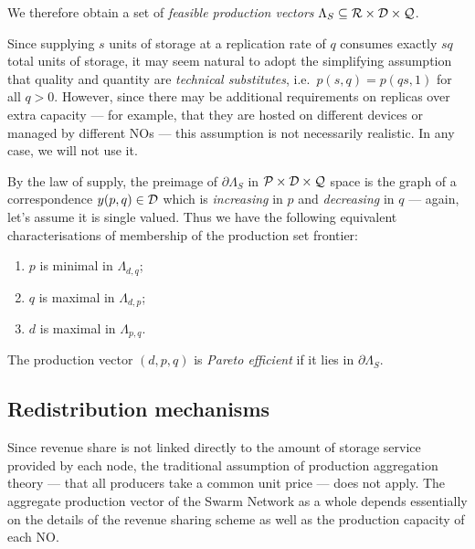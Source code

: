We therefore obtain a set of \emph{feasible production vectors} $\Lambda_S\subseteq\mathcal{R}\times\mathcal{D}\times\mathcal{Q}$.

\begin{remark}

  Since supplying $s$ units of storage at a replication rate of $q$ consumes exactly $sq$ total units of storage, it may seem natural to adopt the simplifying assumption that quality and quantity are \emph{technical substitutes}, i.e.~$p(s,q)=p(qs,1)$ for all $q>0$.
  However, since there may be additional requirements on replicas over extra capacity --- for example, that they are hosted on different devices or managed by different NOs --- this assumption is not necessarily realistic.
  In any case, we will not use it.

\end{remark}

By the law of supply, the preimage of $\partial\Lambda_S$ in $\mathcal{P}\times\mathcal{D}\times\mathcal{Q}$ space is the graph of a correspondence $y(p,q)\in\mathcal{D}$ which is \emph{increasing} in $p$ and \emph{decreasing} in $q$ --- again, let's assume it is single valued.
%
Thus we have the following equivalent characterisations of membership of the production set frontier:
%
\begin{enumerate}
  \item $p$ is minimal in $\Lambda_{d,q}$;
  \item $q$ is maximal in $\Lambda_{d,p}$;
  \item $d$ is maximal in $\Lambda_{p,q}$.
\end{enumerate}

\begin{definition}
  \label{def:efficient}

  The production vector $(d,p,q)$ is \emph{Pareto efficient} if it lies in $\partial\Lambda_S$.

\end{definition}



\subsection{Redistribution mechanisms}
\label{section:redistribution}

Since revenue share is not linked directly to the amount of storage service provided by each node, the traditional assumption of production aggregation theory \cite[\S5.E]{mascollel1995microeconomic} --- that all producers take a common unit price --- does not apply.
%
The aggregate production vector of the Swarm Network as a whole depends essentially on the details of the revenue sharing scheme as well as the production capacity of each NO.

